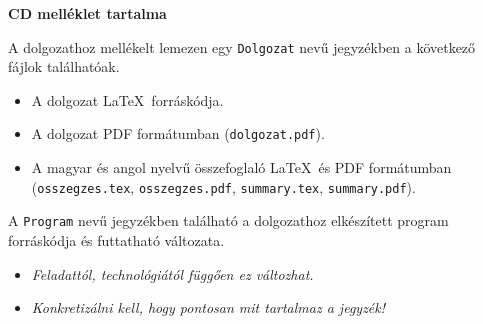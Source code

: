 \pagestyle{empty}

\noindent \textbf{\Large CD melléklet tartalma}

\vskip 1cm

\noindent A dolgozathoz mellékelt lemezen egy \texttt{Dolgozat} nevű jegyzékben a következő fájlok találhatóak.

\begin{itemize}
\item A dolgozat \LaTeX\ forráskódja.
\item A dolgozat PDF formátumban (\texttt{dolgozat.pdf}).
\item A magyar és angol nyelvű összefoglaló \LaTeX\ és PDF formátumban \\ (\texttt{osszegzes.tex}, \texttt{osszegzes.pdf}, \texttt{summary.tex}, \texttt{summary.pdf}).
\end{itemize}

A \texttt{Program} nevű jegyzékben található a dolgozathoz elkészített program forráskódja és futtatható változata.

\begin{itemize}
\item \textit{Feladattól, technológiától függően ez változhat.}
\item \textit{Konkretizálni kell, hogy pontosan mit tartalmaz a jegyzék!}
\end{itemize}

